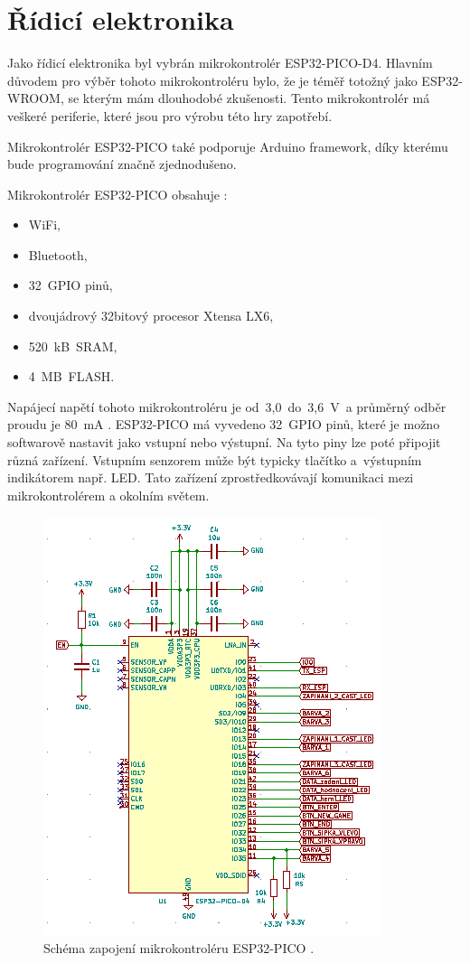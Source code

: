\section{Řídicí elektronika}
Jako řídicí elektronika byl vybrán mikrokontrolér ESP32-PICO-D4. Hlavním důvodem pro výběr tohoto mikrokontroléru bylo, že je téměř totožný 
jako ESP32-WROOM, se 
kterým mám dlouhodobé zkušenosti. Tento mikrokontrolér má veškeré periferie, které jsou pro výrobu této hry zapotřebí. 

Mikrokontrolér ESP32-PICO také podporuje Arduino framework, díky kterému bude programování značně zjednodušeno.

Mikrokontrolér ESP32-PICO obsahuje \cite{PICO_datasheet}: 
\begin{itemize}
    \item WiFi,
    \item Bluetooth, 
    \item 32~GPIO pinů, 
    \item dvoujádrový 32bitový procesor Xtensa LX6,
    \item 520~kB~SRAM, 
    \item 4~MB~FLASH. 
  \end{itemize}

  Napájecí napětí tohoto mikrokontroléru je od~3,0~do~3,6~V~a průměrný odběr proudu je 80~mA \cite{PICO_datasheet}. ESP32-PICO má vyvedeno 
  32~GPIO pinů, které je 
  možno softwarově nastavit jako vstupní nebo výstupní. Na tyto piny lze poté připojit různá zařízení. Vstupním senzorem může 
  být typicky tlačítko a~výstupním indikátorem např. LED. Tato zařízení zprostředkovávají komunikaci mezi mikrokontrolérem a okolním 
  světem.

  \begin{figure}[!h]
    \begin{center}
      \includegraphics[scale=1]{obrazky/ESP32_PICO_schema.png}
    \end{center}
    \caption[Schéma zapojení mikrokontroléru ESP32-PICO \cite{PICO_datasheet}]{Schéma zapojení mikrokontroléru ESP32-PICO \cite{PICO_datasheet}.}
  \end{figure}

